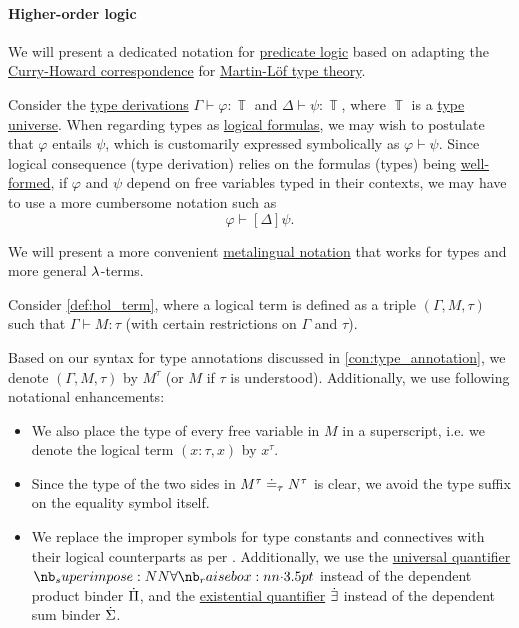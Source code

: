 \paragraph{Higher-order logic}

\begin{remark}\label{rem:hol_term_notation}
  We will present a dedicated notation for \hyperref[rem:predicate_logic]{predicate logic} based on adapting the \hyperref[con:curry_howard_correspondence]{Curry-Howard correspondence} for \hyperref[def:martin_lof_type_theory]{Martin-L\"of type theory}.

  Consider the \hyperref[def:mltt_entailment]{type derivations} \( \Gamma \vdash \varphi: \BbbT \) and \( \Delta \vdash \psi: \BbbT \), where \( \BbbT \) is a \hyperref[def:mltt_signature/universe]{type universe}. When regarding types as \hyperref[con:proposition]{logical formulas}, we may wish to postulate that \( \varphi \) entails \( \psi \), which is customarily expressed symbolically as \( \varphi \vdash \psi \). Since logical consequence (type derivation) relies on the formulas (types) being \hyperref[def:mltt_well_formed_context/types]{well-formed}, if \( \varphi \) and \( \psi \) depend on free variables typed in their contexts, we may have to use a more cumbersome notation such as
  \begin{equation*}
    [\Gamma] \varphi \vdash [\Delta] \psi.
  \end{equation*}

  We will present a more convenient \hyperref[def:metalogic]{metalingual notation} that works for types and more general \( {\mathrm \lambda} \)-terms.

  Consider \cref{def:hol_term}, where a logical term is defined as a triple \( (\Gamma, M, \tau) \) such that \( \Gamma \vdash M: \tau \) (with certain restrictions on \( \Gamma \) and \( \tau \)).

  Based on our syntax for type annotations discussed in \cref{con:type_annotation}, we denote \( (\Gamma, M, \tau) \) by \( M^\tau \) (or \( M \) if \( \tau \) is understood). Additionally, we use following notational enhancements:
  \begin{itemize}
    \item We also place the type of every free variable in \( M \) in a superscript, i.e. we denote the logical term \( (x: \tau, x) \) by \( x^\tau \).

    \item Since the type of the two sides in \( M^\tau \doteq_\tau N^\tau \) is clear, we avoid the type suffix on the equality symbol itself.

    \item We replace the improper symbols for type constants and connectives with their logical counterparts as per . Additionally, we use the \hyperref[def:predicate_logic_alphabet/quantifiers/universal]{universal quantifier} \( \synforall \) instead of the dependent product binder \( \dot{\Pi} \), and the \hyperref[def:predicate_logic_alphabet/quantifiers/existential]{existential quantifier} \( \mathord{\dot{\exists}} \) instead of the dependent sum binder \( \dot{\Sigma} \).
  \end{itemize}
\end{remark}
